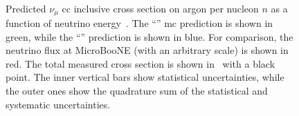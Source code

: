 \begin{figure}[]
\centering
{}
 \\
\caption[Total Cross Section (Stat. $\oplus$ Syst. Unc.)]{Predicted $\nu_\mu$ \acrshort{cc} inclusive  cross section on argon per nucleon $n$ as a function of neutrino energy~\protect{}. The ``\tuneone'' \acrshort{mc} prediction is shown in green, while the ``\tunethree'' prediction is shown in blue. For comparison, the neutrino flux at MicroBooNE (with an arbitrary scale) is shown in red. The total measured cross section is shown in~\protect{} with a black point. The inner vertical bars show statistical uncertainties, while the outer ones show the quadrature sum of the statistical and systematic uncertainties.}
\label{fig:total_xsec_wsyst}
\end{figure}



